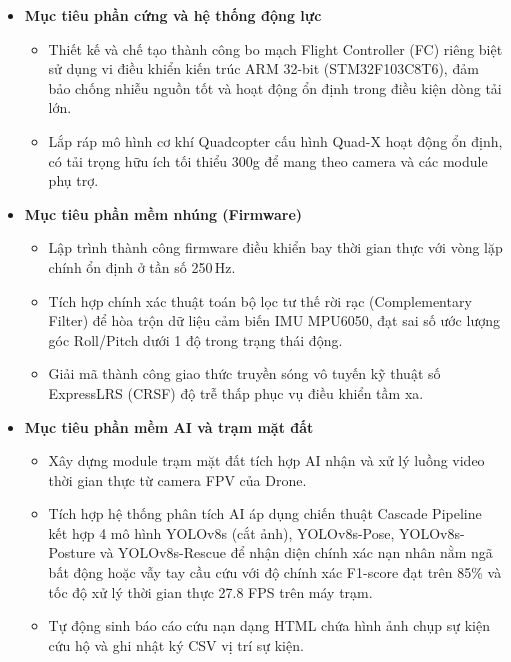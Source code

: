 \begin{itemize}
    \item \textbf{Mục tiêu phần cứng và hệ thống động lực}
    \begin{itemize}
        \item Thiết kế và chế tạo thành công bo mạch Flight Controller (FC) riêng biệt sử dụng vi điều khiển kiến trúc ARM 32-bit (STM32F103C8T6), đảm bảo chống nhiễu nguồn tốt và hoạt động ổn định trong điều kiện dòng tải lớn.
        \item Lắp ráp mô hình cơ khí Quadcopter cấu hình Quad-X hoạt động ổn định, có tải trọng hữu ích tối thiểu 300g để mang theo camera và các module phụ trợ.
    \end{itemize}

    \item \textbf{Mục tiêu phần mềm nhúng (Firmware)}
    \begin{itemize}
        \item Lập trình thành công firmware điều khiển bay thời gian thực với vòng lặp chính ổn định ở tần số 250\,Hz.
        \item Tích hợp chính xác thuật toán bộ lọc tư thế rời rạc (Complementary Filter) để hòa trộn dữ liệu cảm biến IMU MPU6050, đạt sai số ước lượng góc Roll/Pitch dưới 1 độ trong trạng thái động.
        \item Giải mã thành công giao thức truyền sóng vô tuyến kỹ thuật số ExpressLRS (CRSF) độ trễ thấp phục vụ điều khiển tầm xa.
    \end{itemize}

    \item \textbf{Mục tiêu phần mềm AI và trạm mặt đất}
    \begin{itemize}
        \item Xây dựng module trạm mặt đất tích hợp AI nhận và xử lý luồng video thời gian thực từ camera FPV của Drone.
        \item Tích hợp hệ thống phân tích AI áp dụng chiến thuật Cascade Pipeline kết hợp 4 mô hình YOLOv8s (cắt ảnh), YOLOv8s-Pose, YOLOv8s-Posture và YOLOv8s-Rescue để nhận diện chính xác nạn nhân nằm ngã bất động hoặc vẫy tay cầu cứu với độ chính xác F1-score đạt trên 85\% và tốc độ xử lý thời gian thực 27.8 FPS trên máy trạm.
        \item Tự động sinh báo cáo cứu nạn dạng HTML chứa hình ảnh chụp sự kiện cứu hộ và ghi nhật ký CSV vị trí sự kiện.
    \end{itemize}
\end{itemize}

